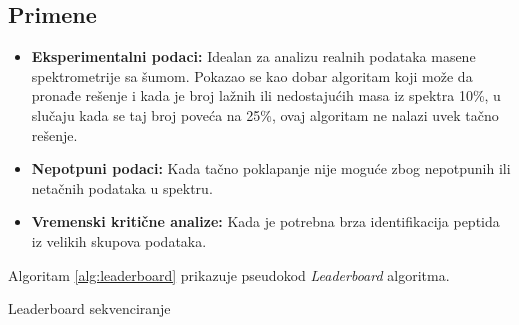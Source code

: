 \documentclass[12pt,oneside]{memoir}
\begin{document}
\subsection{Primene}

\begin{itemize}
    \item \textbf{Eksperimentalni podaci:} Idealan za analizu realnih podataka masene spektrometrije sa šumom. Pokazao se kao dobar algoritam koji može da pronađe rešenje i kada je broj lažnih ili nedostajućih masa iz spektra 10\%, u slučaju kada se taj broj poveća na 25\%, ovaj algoritam ne nalazi uvek tačno rešenje.
    \item \textbf{Nepotpuni podaci:} Kada tačno poklapanje nije moguće zbog nepotpunih ili netačnih podataka u spektru.
    \item \textbf{Vremenski kritične analize:} Kada je potrebna brza identifikacija peptida iz velikih skupova podataka.
\end{itemize}

Algoritam \ref{alg:leaderboard} prikazuje pseudokod \emph{Leaderboard} algoritma.

\begin{algorithm}[H]
\label{alg:leaderboard}
\caption{Leaderboard sekvenciranje}
\SetAlgoLined
\DontPrintSemicolon
{}
\end{algorithm}
\end{document}
